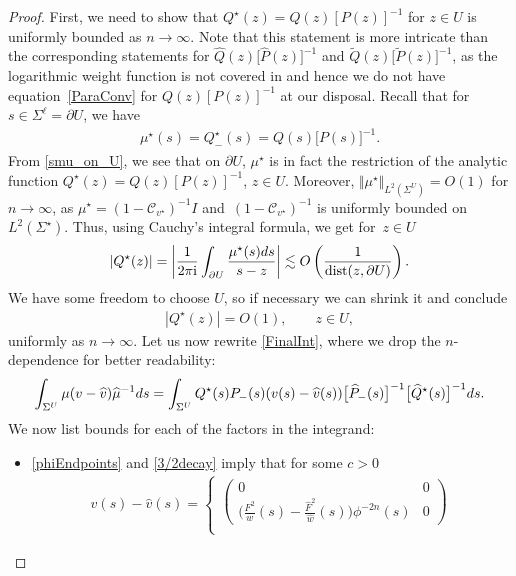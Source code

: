 \documentclass[10pt,a4paper]{amsart}
\newcommand{\Id}{I}
\newcommand{\hw}{\widehat w}
\newcommand{\bQ}{ Q}
\newcommand{\hQ}{{\widehat Q}}
\newcommand{\tQ}{{\widetilde Q}}
\newcommand{\sbQ}{Q^\star}
\newcommand{\shQ}{{\widehat Q^\star}}
\newcommand{\smu}{\mu^\star}
\newcommand{\bmu}{{\mu}}
\newcommand{\hmu}{{\widehat \mu}}
\newcommand{\bP}{P}
\newcommand{\hP}{{\widehat P}}
\newcommand{\tP}{{\widetilde P}}
\newcommand{\bv}{v}
\newcommand{\hv}{{\widehat v}}
\newcommand{\hF}{\widehat F}
\newcommand{\Fw}{\frac{F^2}{w}}
\newcommand{\hFw}{\frac{\hF^2}{\hw}}
\newcommand{\sCauv}{\mathcal C_{\bv^\star}}
\newcommand{\I}{\mathrm{i}}
\newcommand{\dist}{\mathop{\mathrm{dist}}}
\numberwithin{equation}{section}
\begin{document}
\begin{proof}
First, we need to show that $\sbQ(z) = \bQ(z)[\bP(z)]^{-1}$ for $z \in U$ is uniformly bounded as $n \to \infty$. Note that this statement is more intricate than the corresponding statements for $\hQ(z)\big[\hP(z)\big]^{-1}$ and $\tQ(z)\big[\tP(z)\big]^{-1}$, as the logarithmic weight function is not covered in \cite{KMVV} and hence we do not have equation~\eqref{ParaConv} for $\bQ(z)[\bP(z)]^{-1}$ at our disposal. Recall that for~${s\!\in\! \Sigma^\ell = \partial U}$, we have
\begin{align}\label{smu_on_U}
 \smu(s) = \sbQ_-(s) = \bQ(s)\big[\bP(s)\big]^{-1}.
\end{align}
From \eqref{smu_on_U}, we see that on $\partial U$, $\smu$ is in fact the restriction of the analytic function $\sbQ(z) = \bQ(z)[\bP(z)]^{-1}$, $z\in U$. Moreover, $\Vert \smu \Vert_{L^2( \Sigma^U)} = O(1)$ for $n \to \infty$, as $\smu = (1-\sCauv)^{-1}\Id$ and~${(1-\sCauv)^{-1}}$ is uniformly bounded on $L^2(\Sigma^\star)$. Thus, using Cauchy's integral formula, we get for~$z \in U$
\begin{align*}
 |\sbQ(z)| = \bigg|\frac{1}{2\pi\I} \int_{\partial U} \frac{\smu(s){\rm d}s}{s-z}\bigg| \lesssim O\left(\frac{1}{\dist(z,\partial U)}\right).
\end{align*}
We have some freedom to choose $U$, so if necessary we can shrink it and conclude
\begin{align}\label{Qstar}
 |\sbQ(z)| = O(1), \qquad z\in U,
\end{align}
uniformly as $n \to \infty$. Let us now rewrite \eqref{FinalInt}, where we drop the $n$-dependence for better readability:
\begin{align}\label{FinalInt2}
 \int_{ \Sigma^U} \bmu(\bv-\hv)\hmu^{-1} {\rm d}s = \int_{ \Sigma^U} \sbQ(s)\bP_-(s)(\bv(s)-\hv(s))\big[\hP_-(s)\big]^{-1}\big[\shQ(s)\big]^{-1} {\rm d}s.
\end{align}
We now list bounds for each of the factors in the integrand:
\begin{itemize}\itemsep=0pt
 \item \eqref{phiEndpoints} and \eqref{3/2decay} imply that for some $c > 0$
 \begin{align*}\bv(s)-\hv(s) =\begin{cases} \begin{pmatrix}
 0 & 0
 \\
 \big(\Fw(s)-\hFw(s)\big)\phi^{-2n}(s) & 0
 \end{pmatrix}
 \\

\end{cases}
\end{align*}
\end{itemize}
\end{proof}
\end{document}
